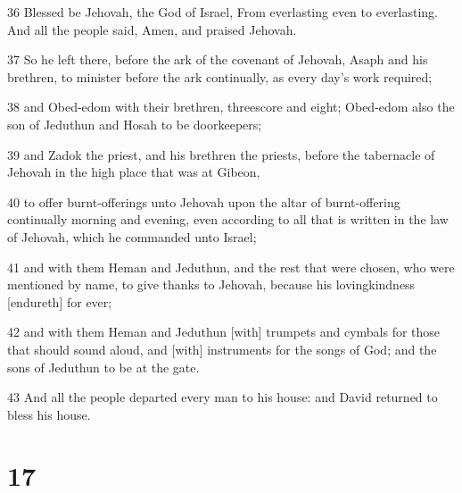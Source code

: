 \par 36 Blessed be Jehovah, the God of Israel, From everlasting even to everlasting. And all the people said, Amen, and praised Jehovah.
\par 37 So he left there, before the ark of the covenant of Jehovah, Asaph and his brethren, to minister before the ark continually, as every day's work required;
\par 38 and Obed-edom with their brethren, threescore and eight; Obed-edom also the son of Jeduthun and Hosah to be doorkeepers;
\par 39 and Zadok the priest, and his brethren the priests, before the tabernacle of Jehovah in the high place that was at Gibeon,
\par 40 to offer burnt-offerings unto Jehovah upon the altar of burnt-offering continually morning and evening, even according to all that is written in the law of Jehovah, which he commanded unto Israel;
\par 41 and with them Heman and Jeduthun, and the rest that were chosen, who were mentioned by name, to give thanks to Jehovah, because his lovingkindness [endureth] for ever;
\par 42 and with them Heman and Jeduthun [with] trumpets and cymbals for those that should sound aloud, and [with] instruments for the songs of God; and the sons of Jeduthun to be at the gate.
\par 43 And all the people departed every man to his house: and David returned to bless his house.

\chapter{17}

